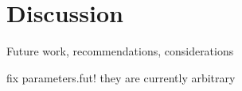 \section{Discussion}
Future work, recommendations, considerations

fix parameters.fut! they are currently arbitrary
